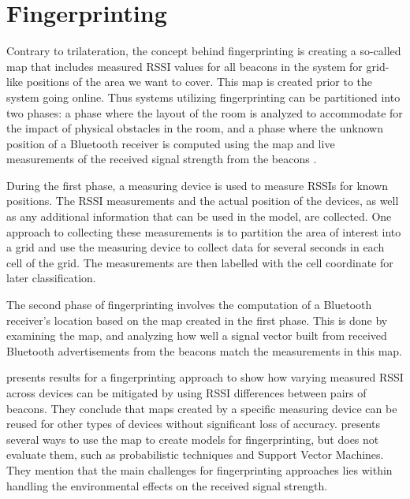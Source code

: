 \section{Fingerprinting}\label{sec:fingerprinting}
Contrary to trilateration, the concept behind fingerprinting is creating a so-called map that includes measured RSSI values for all beacons in the system for grid-like positions of the area we want to cover.
This map is created prior to the system going online.
Thus systems utilizing fingerprinting can be partitioned into two phases: a phase where the layout of the room is analyzed to accommodate for the impact of physical obstacles in the room, and a phase where the unknown position of a Bluetooth receiver is computed using the map and live measurements of the received signal strength from the beacons \cite{presence_ble_review, taking_localization_to_the_wild}.

During the first phase, a measuring device is used to measure RSSIs for known positions.
The RSSI measurements and the actual position of the devices, as well as any additional information that can be used in the model, are collected. 
One approach to collecting these measurements is to partition the area of interest into a grid and use the measuring device to collect data for several seconds in each cell of the grid.\cite{improving_indoor_localization}
The measurements are then labelled with the cell coordinate for later classification.

The second phase of fingerprinting involves the computation of a Bluetooth receiver's location based on the map created in the first phase. 
This is done by examining the map, and analyzing how well a signal vector built from received Bluetooth advertisements from the beacons match the measurements in this map.

\citeauthor{taking_localization_to_the_wild} \cite{taking_localization_to_the_wild} presents results for a fingerprinting approach to show how varying measured RSSI across devices can be mitigated by using RSSI differences between pairs of beacons.
They conclude that maps created by a specific measuring device can be reused for other types of devices without significant loss of accuracy. 
\citeauthor{presence_ble_review}\cite{presence_ble_review} presents several ways to use the map to create models for fingerprinting, but does not evaluate them, such as probabilistic techniques and Support Vector Machines. 
They mention that the main challenges for fingerprinting approaches lies within handling the environmental effects on the received signal strength.

